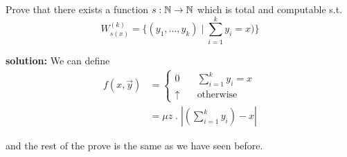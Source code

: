 \begin{exercise}
  Prove that there exists a function $s: \mathbb{N} \rightarrow \mathbb{N}$ which is total and computable
  s.t.
  \[W_{s(x)}^{(k)} = \{(y_1, \dots, y_k) \; | \;
    \sum\limits_{i=1}^ky_i = x)\}\]

  \textbf{solution:} We can define
  \[
    \begin{aligned}
      f(x, \vec{y}) &=
      \begin{cases}
        0 & \quad \sum_{i=1}^ky_i = x \\
        \uparrow & \quad \mbox{otherwise}
      \end{cases} \\
      &= \mu z \; . \; |(\sum_{i=1}^ky_i) - x|
    \end{aligned}
  \]

  and the rest of the prove is the same as we have seen before.
\end{exercise}







